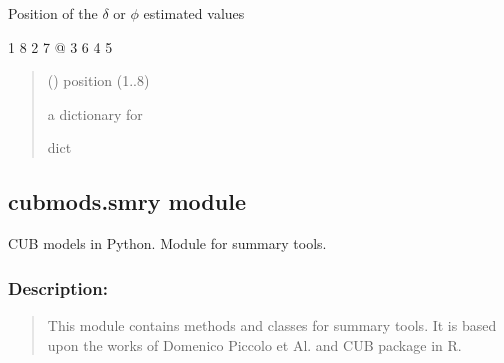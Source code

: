 \documentclass[letterpaper,10pt,english]{sphinxmanual}
\begin{document}
\begin{fulllineitems}
\label{\detokenize{cubmods:cubmods.multicub.pos_kwargs}}
\pysigstartsignatures
{}
\pysigstopsignatures
\sphinxAtStartPar
Position of the \(\delta\) or \(\phi\) estimated values

\begin{sphinxVerbatim}[commandchars=\\\{\}]
    1
  8   2
7   @   3
  6   4
    5
\end{sphinxVerbatim}
\begin{quote}\begin{description}
\sphinxAtStartPar
{} () \textendash{} position (1..8)

\sphinxAtStartPar
a dictionary for 

\sphinxAtStartPar
dict

\end{description}\end{quote}

\end{fulllineitems}



\subsection{cubmods.smry module}
\label{\detokenize{cubmods:module-cubmods.smry}}\label{\detokenize{cubmods:cubmods-smry-module}}
\sphinxAtStartPar
CUB models in Python.
Module for summary tools.


\subsubsection{Description:}
\label{\detokenize{cubmods:id885}}\begin{quote}

\sphinxAtStartPar
This module contains methods and classes
for summary tools.
It is based upon the works of Domenico
Piccolo et Al. and CUB package in R.
\end{quote}
\end{document}
